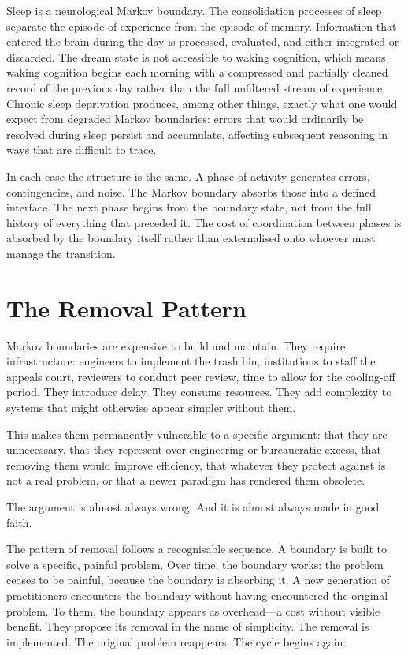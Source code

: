 \documentclass[12pt, a4paper]{article}
\begin{document}
Sleep is a neurological Markov boundary. The consolidation processes
of sleep separate the episode of experience from the episode of
memory. Information that entered the brain during the day is processed,
evaluated, and either integrated or discarded. The dream state is not
accessible to waking cognition, which means waking cognition begins
each morning with a compressed and partially cleaned record of the
previous day rather than the full unfiltered stream of experience.
Chronic sleep deprivation produces, among other things, exactly what
one would expect from degraded Markov boundaries: errors that would
ordinarily be resolved during sleep persist and accumulate, affecting
subsequent reasoning in ways that are difficult to trace.

In each case the structure is the same. A phase of activity generates
errors, contingencies, and noise. The Markov boundary absorbs those
into a defined interface. The next phase begins from the boundary
state, not from the full history of everything that preceded it. The
cost of coordination between phases is absorbed by the boundary itself
rather than externalised onto whoever must manage the transition.

\section{The Removal Pattern}

Markov boundaries are expensive to build and maintain. They require
infrastructure: engineers to implement the trash bin, institutions
to staff the appeals court, reviewers to conduct peer review, time to
allow for the cooling-off period. They introduce delay. They consume
resources. They add complexity to systems that might otherwise appear
simpler without them.

This makes them permanently vulnerable to a specific argument: that
they are unnecessary, that they represent over-engineering or
bureaucratic excess, that removing them would improve efficiency, that
whatever they protect against is not a real problem, or that a newer
paradigm has rendered them obsolete.

The argument is almost always wrong. And it is almost always made in
good faith.

The pattern of removal follows a recognisable sequence. A boundary
is built to solve a specific, painful problem. Over time, the boundary
works: the problem ceases to be painful, because the boundary is
absorbing it. A new generation of practitioners encounters the
boundary without having encountered the original problem. To them, the
boundary appears as overhead---a cost without visible benefit. They
propose its removal in the name of simplicity. The removal is
implemented. The original problem reappears. The cycle begins again.
\end{document}

